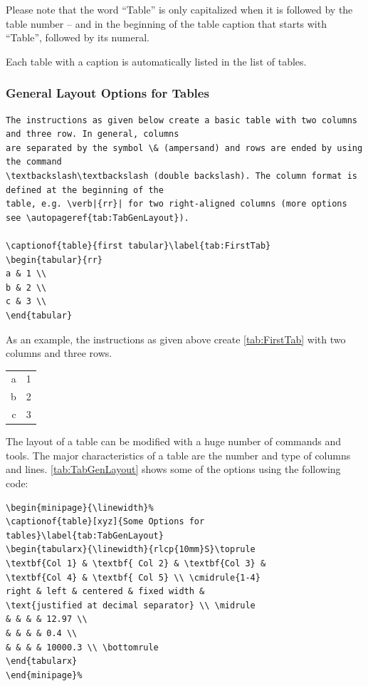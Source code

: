Please note that the word ``Table'' is only capitalized when it is followed by the table number -- and in the
beginning of the table caption that starts with ``Table'', followed by its numeral.

Each table with a caption is automatically listed in the list of tables.

\subsubsection{General Layout Options for Tables}
\begin{verbatim}
The instructions as given below create a basic table with two columns and three row. In general, columns
are separated by the symbol \& (ampersand) and rows are ended by using the command
\textbackslash\textbackslash (double backslash). The column format is defined at the beginning of the
table, e.g. \verb|{rr}| for two right-aligned columns (more options see \autopageref{tab:TabGenLayout}).

\captionof{table}{first tabular}\label{tab:FirstTab}
\begin{tabular}{rr}
a & 1 \\
b & 2 \\
c & 3 \\
\end{tabular}
\end{verbatim}

As an example, the instructions as given above create \autoref{tab:FirstTab} with two columns and three
rows.
\begin{minipage}{\linewidth}
   \label{tab:FirstTab}
   \begin{tabular}{rr}
      a & 1 \\
      b & 2 \\
      c & 3 \\
   \end{tabular}
\end{minipage}

The layout of a table can be modified with a huge number of commands and tools. The major
characteristics of a table are the number and type of columns and lines. \autoref{tab:TabGenLayout}
shows some of the options using the following code:
\begin{verbatim}
\begin{minipage}{\linewidth}%
\captionof{table}[xyz]{Some Options for tables}\label{tab:TabGenLayout}
\begin{tabularx}{\linewidth}{rlcp{10mm}S}\toprule
\textbf{Col 1} & \textbf{ Col 2} & \textbf{Col 3} &
\textbf{Col 4} & \textbf{ Col 5} \\ \cmidrule{1-4}
right & left & centered & fixed width &
\text{justified at decimal separator} \\ \midrule
& & & & 12.97 \\
& & & & 0.4 \\
& & & & 10000.3 \\ \bottomrule
\end{tabularx}
\end{minipage}%
\end{verbatim}

